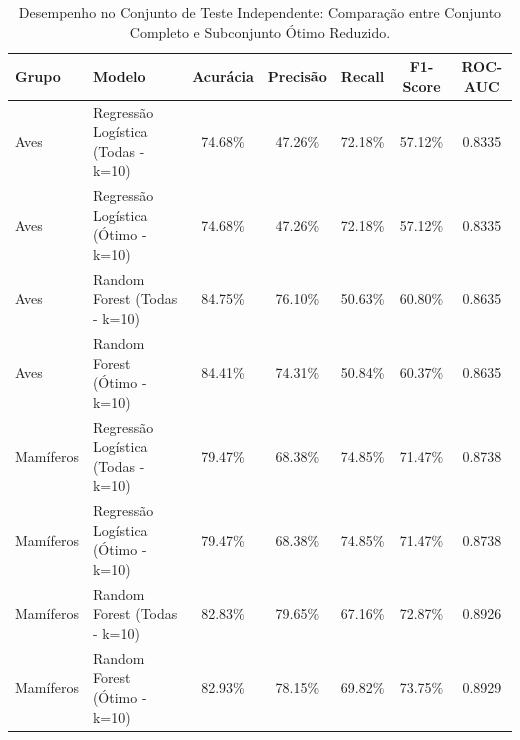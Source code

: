 \begin{table}[htbp]
\centering
\caption{Desempenho no Conjunto de Teste Independente: Comparação entre Conjunto Completo e Subconjunto Ótimo Reduzido.}
\label{tab:teste_final_subconjuntos}
\begin{tabular}{llccccc}
\hline
\textbf{Grupo} & \textbf{Modelo} & \textbf{Acurácia} & \textbf{Precisão} & \textbf{Recall} & \textbf{F1-Score} & \textbf{ROC-AUC} \\
\hline
Aves & Regressão Logística (Todas - k=10) & 74.68\% & 47.26\% & 72.18\% & 57.12\% & 0.8335 \\
Aves & Regressão Logística (Ótimo - k=10) & 74.68\% & 47.26\% & 72.18\% & 57.12\% & 0.8335 \\
Aves & Random Forest (Todas - k=10) & 84.75\% & 76.10\% & 50.63\% & 60.80\% & 0.8635 \\
Aves & Random Forest (Ótimo - k=10) & 84.41\% & 74.31\% & 50.84\% & 60.37\% & 0.8635 \\
Mamíferos & Regressão Logística (Todas - k=10) & 79.47\% & 68.38\% & 74.85\% & 71.47\% & 0.8738 \\
Mamíferos & Regressão Logística (Ótimo - k=10) & 79.47\% & 68.38\% & 74.85\% & 71.47\% & 0.8738 \\
Mamíferos & Random Forest (Todas - k=10) & 82.83\% & 79.65\% & 67.16\% & 72.87\% & 0.8926 \\
Mamíferos & Random Forest (Ótimo - k=10) & 82.93\% & 78.15\% & 69.82\% & 73.75\% & 0.8929 \\
\hline
\end{tabular}
\end{table}
